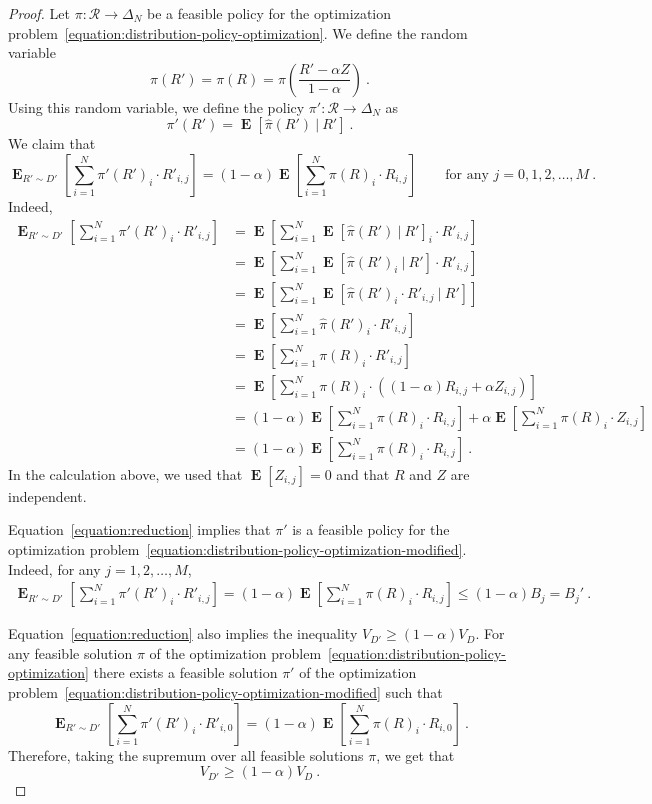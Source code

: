 \documentclass[12pt]{article}
\newcommand{\Requests}{\mathcal{R}}
\DeclareMathOperator*{\Exp}{\mathbf{E}}
\theoremstyle{definition}
\begin{document}
\begin{proof}
Let $\pi:\Requests \to \Delta_N$ be a feasible policy for the optimization
problem~\eqref{equation:distribution-policy-optimization}. We define the random
variable
$$
\widehat{\pi}(R') = \pi(R) = \pi \left( \frac{R' - \alpha Z}{1-\alpha} \right) \: .
$$
Using this random variable, we define the policy $\pi':\Requests \to \Delta_N$ as
$$
\pi'(R') = \Exp[ \widehat{\pi}(R') ~|~ R' ] \: .
$$
We claim that
\begin{equation}
\label{equation:reduction}
\Exp_{R' \sim D'} \left[ \sum_{i=1}^N \pi'(R')_i \cdot R'_{i,j} \right] =  (1 - \alpha) \Exp \left[ \sum_{i=1}^N \pi(R)_i \cdot R_{i,j} \right] \qquad \text{for any $j=0,1,2,\dots,M$} \: .
\end{equation}
Indeed,
\begin{align*}
\Exp_{R' \sim D'} \left[ \sum_{i=1}^N \pi'(R')_i \cdot R'_{i,j} \right]
& = \Exp \left[ \sum_{i=1}^N \Exp[ \widehat{\pi}(R') ~|~ R' ]_i \cdot R'_{i,j} \right] \\
& = \Exp \left[ \sum_{i=1}^N \Exp[ \widehat{\pi}(R')_i ~|~ R' ] \cdot R'_{i,j} \right] \\
& = \Exp \left[ \sum_{i=1}^N \Exp[ \widehat{\pi}(R')_i \cdot R'_{i,j} ~|~ R' ] \right] \\
& = \Exp \left[ \sum_{i=1}^N \widehat{\pi}(R')_i \cdot R'_{i,j} \right] \\
& = \Exp \left[ \sum_{i=1}^N \pi(R)_i \cdot R'_{i,j} \right] \\
& = \Exp \left[ \sum_{i=1}^N \pi(R)_i \cdot \left( (1 - \alpha) R_{i,j} + \alpha Z_{i,j} \right) \right] \\
& = (1 - \alpha) \Exp \left[ \sum_{i=1}^N \pi(R)_i \cdot R_{i,j} \right]  + \alpha \Exp \left[ \sum_{i=1}^N \pi(R)_i \cdot Z_{i,j} \right] \\
& = (1 - \alpha) \Exp \left[ \sum_{i=1}^N \pi(R)_i \cdot R_{i,j} \right] \: .
\end{align*}
In the calculation above, we used that $\Exp[ Z_{i,j} ] = 0$ and that $R$ and
$Z$ are independent.

Equation~\eqref{equation:reduction} implies that $\pi'$ is a feasible policy for
the optimization
problem~\eqref{equation:distribution-policy-optimization-modified}. Indeed, for
any $j=1,2,\dots,M$,
\begin{align*}
\Exp_{R' \sim D'} \left[ \sum_{i=1}^N \pi'(R')_i \cdot R'_{i,j} \right]
=  (1 - \alpha) \Exp \left[ \sum_{i=1}^N \pi(R)_i \cdot R_{i,j} \right]
\le (1 - \alpha) B_j
= B_j' \: .
\end{align*}

Equation~\eqref{equation:reduction} also implies the inequality $V_{D'} \ge (1 -
\alpha) V_D$. For any feasible solution $\pi$ of the optimization
problem~\eqref{equation:distribution-policy-optimization} there exists a
feasible solution $\pi'$ of the optimization
problem~\eqref{equation:distribution-policy-optimization-modified} such that
$$
\Exp_{R' \sim D'} \left[ \sum_{i=1}^N \pi'(R')_i \cdot R'_{i,0} \right] =  (1 - \alpha) \Exp \left[ \sum_{i=1}^N \pi(R)_i \cdot R_{i,0} \right] \: .
$$
Therefore, taking the supremum over all feasible solutions $\pi$, we get that
$$
V_{D'} \ge (1 - \alpha) V_D \: .
$$
\end{proof}
\end{document}
